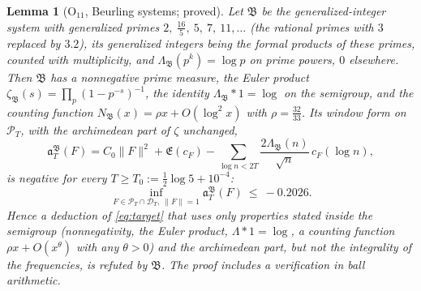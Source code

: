 \documentclass[11pt]{amsart}
\newtheorem{lemma}[theorem]{Lemma}
\theoremstyle{definition}
\theoremstyle{remark}
\newcommand{\PT}{\mathcal P_T}
\newcommand{\cF}{c_F}
\newcommand{\Lev}{\mathfrak E}
\begin{document}
\begin{lemma}[$\mathrm O_{11}$, Beurling systems; proved]\label{lem:shape-beurling}
Let $\mathfrak B$ be the generalized-integer system with generalized primes $2,\ \tfrac{16}5,\ 5,\ 7,\ 11,\dots$ (the rational primes with $3$
replaced by $3.2$), its generalized integers being the formal products of these primes, counted with multiplicity, and
$\Lambda_{\mathfrak B}(p^k)=\log p$ on prime powers, $0$ elsewhere. Then $\mathfrak B$ has a nonnegative prime measure, the Euler product
$\zeta_{\mathfrak B}(s)=\prod_p(1-p^{-s})^{-1}$, the identity $\Lambda_{\mathfrak B}*1=\log$ on the semigroup, and the counting function
$N_{\mathfrak B}(x)=\rho x+O(\log^2x)$ with $\rho=\frac{32}{33}$. Its window form on $\PT$, with the archimedean part of $\zeta$ unchanged,
\[
\mathfrak a_T^{\mathfrak B}(F)=C_0\|F\|^2+\Lev(\cF)-\sum_{\log n<2T}\frac{2\Lambda_{\mathfrak B}(n)}{\sqrt n}\,\cF(\log n),
\]
is negative for every $T\ge T_0:=\frac12\log5+10^{-4}$:
\[
\inf_{F\in\PT\cap\mathcal D_T,\ \|F\|=1}\mathfrak a_T^{\mathfrak B}(F)\ \le\ -0.2026 .
\]
Hence a deduction of \eqref{eq:target} that uses only properties stated inside the semigroup (nonnegativity, the Euler product,
$\Lambda*1=\log$, a counting function $\rho x+O(x^\theta)$ with any $\theta>0$) and the archimedean part, but not the integrality of
the frequencies, is refuted by $\mathfrak B$. The proof includes a verification in ball arithmetic.
\end{lemma}
\end{document}
